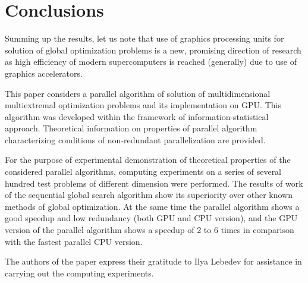 \documentclass[smallcondensed]{svjour3}     %
\begin{document}
\section{Conclusions} \label{sec:7}

Summing up the results, let us note that use of graphics processing units for solution of global optimization problems is a new, promising direction of research as high efficiency of modern supercomputers is reached (generally) due to use of graphics accelerators. 

This paper considers a parallel algorithm of solution of multidimensional multiextremal optimization problems and its implementation on GPU. This algorithm was developed within the framework of information-statistical approach. Theoretical information on properties of parallel algorithm characterizing conditions of non-redundant parallelization are provided.

For the purpose of experimental demonstration of theoretical properties of the considered parallel algorithms, computing experiments on a series of several hundred test problems of different dimension were performed. The results of work of the sequential global search algorithm show its superiority over other known methods of global optimization. At the same time the parallel algorithm shows a good speedup and low redundancy (both GPU and CPU version), and the GPU version of the parallel algorithm shows a speedup of 2 to 6 times in comparison with the fastest parallel CPU version.

\begin{acknowledgements}

The authors of the paper express their gratitude to Ilya Lebedev for assistance in carrying out the computing experiments.

\end{acknowledgements}

\end{document}
